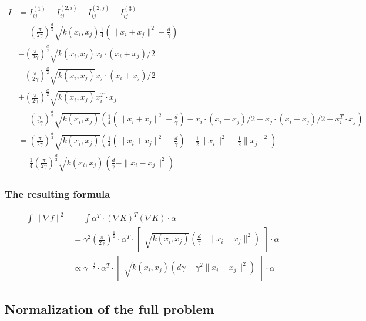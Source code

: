 \documentclass[12pt]{article}
\begin{document}
\begin{align}
I &= I_{ij}^{(1)}-I_{ij}^{(2,i)}-I_{ij}^{(2,j)}+I_{ij}^{(3)}\\
&= \left(\frac{\pi}{2 \gamma}\right)^{\frac{d}{2}} \sqrt{k(x_i,x_j)}  \frac{1}{4} \left(\|x_i + x_j\|^2 + \frac{d}{\gamma}\right)\\
&- \left(\frac{\pi}{2 \gamma}\right)^{\frac{d}{2}} \sqrt{k(x_i,x_j)}  x_i \cdot (x_i + x_j) / 2\\
&- \left(\frac{\pi}{2 \gamma}\right)^{\frac{d}{2}} \sqrt{k(x_i,x_j)}  x_j \cdot (x_i + x_j) / 2 \\
&+ \left(\frac{\pi}{2\gamma}\right)^{\frac{d}{2}}\sqrt{k(x_i,x_j)} x_i^T\cdot x_j\\
&= \left(\frac{\pi}{2\gamma}\right)^{\frac{d}{2}}\sqrt{k(x_i,x_j)} \left(\frac{1}{4} \left(\|x_i + x_j\|^2 + \frac{d}{\gamma}\right) - x_i \cdot (x_i + x_j) / 2 -  x_j \cdot (x_i + x_j) / 2 + x_i^T\cdot x_j\right)\\
&= \left(\frac{\pi}{2\gamma}\right)^{\frac{d}{2}}\sqrt{k(x_i,x_j)} \left(\frac{1}{4} \left(\|x_i + x_j\|^2 + \frac{d}{\gamma}\right) - \frac{1}{2}\|x_i\|^2 - \frac{1}{2}\|x_j\|^2\right)\\
&= \frac{1}{4} \left(\frac{\pi}{2\gamma}\right)^{\frac{d}{2}}\sqrt{k(x_i,x_j)} \left( \frac{d}{\gamma} - \|x_i - x_j\|^2\right)
\end{align}

\subsubsection{The resulting formula}

\begin{align}
\int \|\nabla f \|^2 &= \int \alpha^T\cdot (\nabla K)^T (\nabla K) \cdot \alpha \\
&= \gamma^2 \left(\frac{\pi}{2\gamma}\right)^{\frac{d}{2}} \cdot \alpha^T \cdot \begin{bmatrix} \sqrt{k(x_i,x_j)} \left( \frac{d}{\gamma} - \|x_i - x_j\|^2\right) \end{bmatrix} \cdot \alpha\\
&\propto \gamma^{-\frac{d}{2}}  \cdot \alpha^T \cdot \begin{bmatrix} \sqrt{k(x_i,x_j)} \left( d\gamma - \gamma^2\|x_i - x_j\|^2\right) \end{bmatrix} \cdot \alpha
\end{align}

\subsection{Normalization of the full problem}
\end{document}
